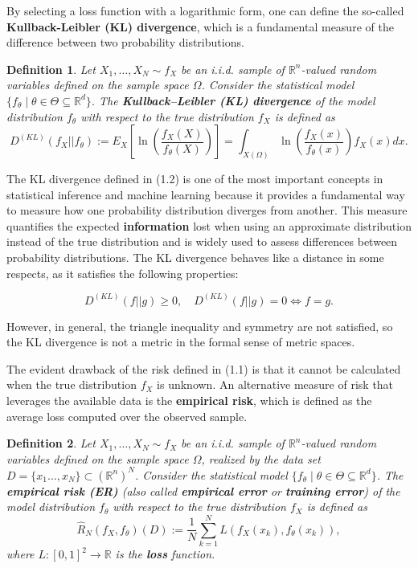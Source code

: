 \documentclass{report}
\newtheorem{definition}{Definition}[chapter]
\begin{document}
By selecting a loss function with a logarithmic form, one can define the so-called \textbf{Kullback-Leibler (KL) divergence}, which is a fundamental measure of the difference between two probability distributions.

\begin{definition}
Let $X_1,\dots,X_N \sim f_X$ be an i.i.d. sample of $\mathbb{R}^n$-valued random variables defined on the sample space $\Omega$. Consider the statistical model $\{f_\theta \mid\theta\in\Theta\subseteq\mathbb{R}^d\}$. The \textbf{Kullback–Leibler (KL) divergence} of the model distribution $f_\theta$ with respect to the true distribution $f_X$ is defined as
\begin{equation}
D^{(KL)}(f_X||f_\theta) := E_X \left[\ln\left(\frac{f_X(X)}{f_\theta(X)}\right)\right] = \int_{X(\Omega)} \ln \left( \frac{f_X(x)}{f_\theta(x)}  \right)f_X(x)dx.
\end{equation}
\end{definition}

The KL divergence defined in (1.2) is one of the most important concepts in statistical inference and machine learning because it provides a fundamental way to measure how one probability distribution diverges from another. This measure quantifies the expected \textbf{information} lost when using an approximate distribution instead of the true distribution and is widely used to assess differences between probability distributions. The KL divergence behaves like a distance in some respects, as it satisfies the following properties:

\begin{equation}
 D^{(KL)}(f||g) \geq 0, \quad D^{(KL)}(f||g) = 0 \iff f = g.
\end{equation}

However, in general, the triangle inequality and symmetry are not satisfied, so the KL divergence is not a metric in the formal sense of metric spaces.

The evident drawback of the risk defined in (1.1) is that it cannot be calculated when the true distribution $f_X$ is unknown. An alternative measure of risk that leverages the available data is the \textbf{empirical risk}, which is defined as the average loss computed over the observed sample.

\begin{definition}
Let $X_1,\dots,X_N \sim f_X$ be an i.i.d. sample of $\mathbb{R}^n$-valued random variables defined on the sample space $\Omega$, realized by the data set $D = \{x_1\dots,x_N\} \subset (\mathbb{R}^n)^N$. Consider the statistical model $\{f_\theta \mid \theta \in \Theta \subseteq \mathbb{R}^d\}$. The \textbf{empirical risk (ER)} (also called \textbf{empirical error} or \textbf{training error}) of the model distribution $f_\theta$ with respect to the true distribution $f_X$ is defined as
\begin{equation}
\hat{R}_N(f_X,f_\theta)(D) := \frac{1}{N}\sum_{k=1}^{N}L(f_X(x_k),f_\theta(x_k)),
\end{equation}
where $L : [0,1]^2 \to \mathbb{R}$ is the \textbf{loss} function.
\end{definition}
\end{document}
